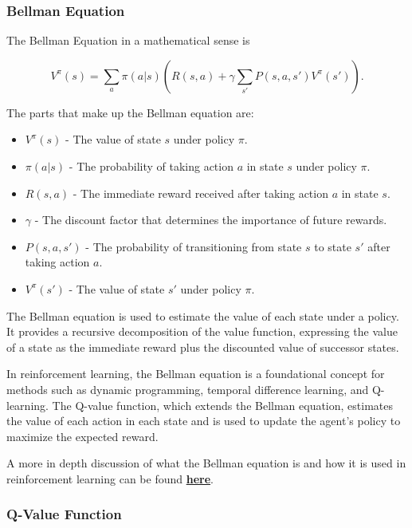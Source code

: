 \documentclass[
	a4paper, %
	10pt, %
	unnumberedsections, %
	twoside, %
]{LTJournalArticle}
\begin{document}
\subsubsection{Bellman Equation}

The Bellman Equation in a mathematical sense is

\begin{equation}\label{eq:bellman}
    V^{\pi}(s) = \sum_{a} \pi(a|s) \left( R(s,a) + \gamma \sum_{s'} P(s,a,s')V^{\pi}(s') \right).
\end{equation}

The parts that make up the Bellman equation are:

\begin{itemize}
    \item $V^{\pi}(s)$ - The value of state $s$ under policy $\pi$.
    \item $\pi(a|s)$ - The probability of taking action $a$ in state $s$ under policy $\pi$.
    \item $R(s,a)$ - The immediate reward received after taking action $a$ in state $s$.
    \item $\gamma$ - The discount factor that determines the importance of future rewards.
    \item $P(s,a,s')$ - The probability of transitioning from state $s$ to state $s'$ after taking action $a$.
    \item $V^{\pi}(s')$ - The value of state $s'$ under policy $\pi$.
\end{itemize}

The Bellman equation is used to estimate the value of each state under a policy. It provides a recursive decomposition of the value function, expressing the value of a state as the immediate reward 
plus the discounted value of successor states.

In reinforcement learning, the Bellman equation is a foundational concept for methods such as dynamic programming, temporal difference learning, and Q-learning. The Q-value function, which extends the 
Bellman equation, estimates the value of each action in each state and is used to update the agent's policy to maximize the expected reward.

A more in depth discussion of what the Bellman equation is and how it is used in reinforcement learning can be found \href{https://en.wikipedia.org/wiki/Bellman_equation}{\textbf{here}}.

\subsubsection{Q-Value Function}
\end{document}
